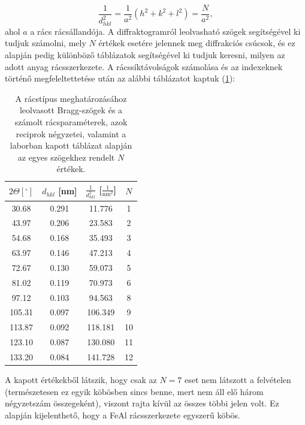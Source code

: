 \documentclass[12pt,a4paper]{article}
\begin{document}
$$\frac{1}{d_{hkl}^2}=\frac{1}{a^2}(h^2+k^2+l^2)=\frac{N}{a^2},$$
ahol $a$ a rács rácsállandója. A diffraktogramról leolvasható szögek segítségével ki tudjuk számolni, mely $N$ értékek esetére jelennek meg diffrakciós csúcsok, és ez alapján pedig különböző táblázatok segítségével ki tudjuk keresni, milyen az adott anyag rácsszerkezete. A rácssíktávolságok számolása és az indexeknek történő megfeleltettetése után az alábbi táblázatot kaptuk (\ref{tab:1}):\\
\begin{table}[!h]
\begin{center}
\begin{tabular}{|c|c|c|c|}
\hline
$ 2\Theta [^{\circ}]$ &  $d_{hkl} $ [nm] & $\frac{1}{d_{hkl}^2}$ [$\frac{1}{\textrm{nm}^2}$] & $N$ \\
\hline
30.68 & 0.291 & 11.776 & 1 \\
\hline
43.97 & 0.206 & 23.583 & 2 \\
\hline
54.68 & 0.168 & 35.493 & 3 \\
\hline
63.97 & 0.146 & 47.213 & 4 \\
\hline
72.67 & 0.130 & 59.073 & 5 \\
\hline
81.02 & 0.119 & 70.973 & 6 \\
\hline
97.12 & 0.103 & 94.563 & 8 \\
\hline
105.31 & 0.097 & 106.349 & 9 \\
\hline
113.87 & 0.092 & 118.181 & 10 \\
\hline
123.10 & 0.087 & 130.080 & 11 \\
\hline
133.20 & 0.084 & 141.728 & 12 \\
\hline
\end{tabular}
\caption{A rácstípus meghatározásához leolvasott Bragg-szögek és a számolt rácsparaméterek, azok reciprok négyzetei, valamint a laborban kapott táblázat alapján az egyes szögekhez rendelt $N$ értékek.}
\label{tab:1}
\end{center}
\end{table}
\newline
A kapott értékekből látszik, hogy csak az $N=7$ eset nem látszott a felvételen (természetesen ez egyik köbösben sincs benne, mert nem áll elő három négyzetszám összegeként), viszont rajta kívül az összes többi jelen volt. Ez alapján kijelenthető, hogy a FeAl rácsszerkezete egyszerű köbös.
\newpage
\end{document}
